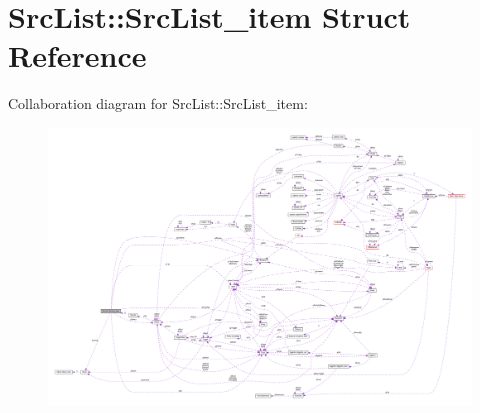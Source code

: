 \hypertarget{structSrcList_1_1SrcList__item}{}\section{Src\+List\+:\+:Src\+List\+\_\+item Struct Reference}
\label{structSrcList_1_1SrcList__item}


Collaboration diagram for Src\+List\+:\+:Src\+List\+\_\+item\+:\nopagebreak
\begin{figure}[H]
\begin{center}
\leavevmode
\includegraphics[width=350pt]{structSrcList_1_1SrcList__item__coll__graph}
\end{center}
\end{figure}
